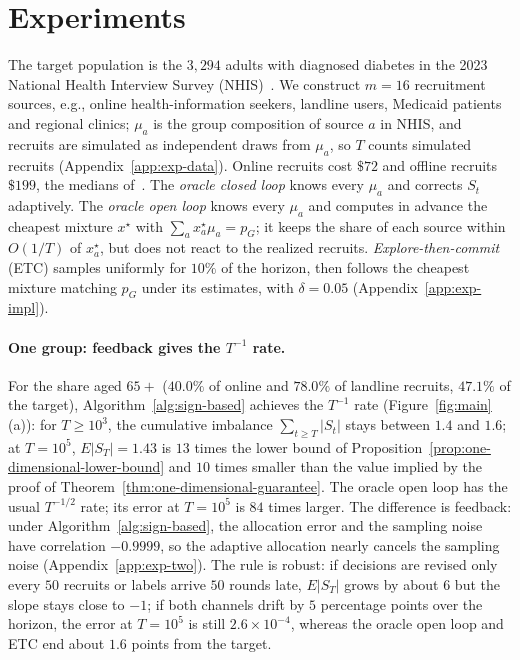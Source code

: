 \documentclass[twoside]{article}
\begin{document}
\section{Experiments}
\label{sec:experiments}

The target population is the \(3{,}294\) adults with diagnosed diabetes in
the 2023 National Health Interview Survey (NHIS)~\citep{nhis2023}. We
construct \(m=16\) recruitment sources, e.g., online health-information
seekers, landline users, Medicaid patients and regional clinics;
\(\mu_a\) is the group composition of source \(a\) in NHIS, and recruits
are simulated as independent draws from \(\mu_a\), so \(T\) counts
simulated recruits (Appendix~\ref{app:exp-data}). Online recruits cost
\(\$72\) and offline recruits \(\$199\), the medians
of~\citet{brogger2020online}. The \emph{oracle closed loop} knows every
\(\mu_a\) and corrects \(S_t\) adaptively. The \emph{oracle open loop}
knows every \(\mu_a\) and computes in advance the cheapest mixture
\(x^\star\) with \(\sum_a x^\star_a\mu_a=p_G\); it keeps the share of each
source within \(O(1/T)\) of \(x^\star_a\), but does not react to the
realized recruits. \emph{Explore-then-commit} (ETC) samples uniformly for
\(10\%\) of the horizon, then follows the cheapest mixture matching \(p_G\)
under its estimates, with \(\delta=0.05\) (Appendix~\ref{app:exp-impl}).

\paragraph{One group: feedback gives the \(T^{-1}\) rate.}
For the share aged \(65+\) (\(40.0\%\) of online and \(78.0\%\) of landline
recruits, \(47.1\%\) of the target), Algorithm~\ref{alg:sign-based} achieves
the \(T^{-1}\) rate (Figure~\ref{fig:main}(a)): for \(T\ge10^3\), the
cumulative imbalance \(\sum_{t \geq T} |S_{t}|\) stays between \(1.4\) and
\(1.6\); at \(T=10^5\), \(E|S_T|=1.43\) is \(13\) times the lower bound of
Proposition~\ref{prop:one-dimensional-lower-bound} and \(10\) times smaller
than the value implied by the proof of
Theorem~\ref{thm:one-dimensional-guarantee}. The oracle open loop has the
usual \(T^{-1/2}\) rate; its error at
\(T=10^5\) is \(84\) times larger. The difference is feedback: under
Algorithm~\ref{alg:sign-based}, the allocation error and the sampling noise
have correlation \(-0.9999\), so the adaptive allocation nearly cancels the
sampling noise (Appendix~\ref{app:exp-two}). The rule is robust: if
decisions are revised only every \(50\) recruits or labels arrive \(50\)
rounds late, \(E|S_T|\) grows by about \(6\) but the slope stays close to
\(-1\); if both channels drift by \(5\) percentage points over the horizon,
the error at \(T=10^5\) is still \(2.6\times10^{-4}\), whereas the oracle
open loop and ETC end about \(1.6\) points from the target.
\end{document}

